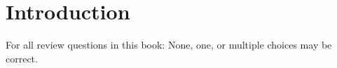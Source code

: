 
\section{Introduction}

For all review questions in this book: None, one, or multiple
choices may be correct.

